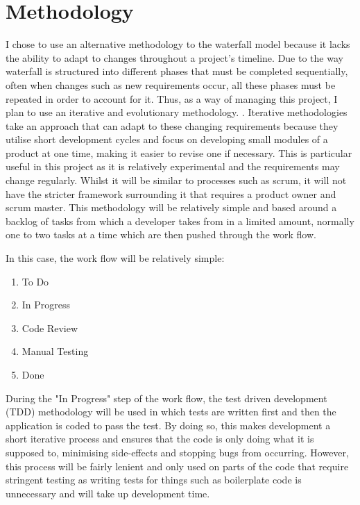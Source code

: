 \documentclass[]{report}
\begin{document}
	\chapter{Methodology}
	I chose to use an alternative methodology to the waterfall model because it lacks the ability to adapt to changes throughout a project's timeline. Due to the way waterfall is structured into different phases that must be completed sequentially, often when changes such as new requirements occur, all these phases must be repeated in order to account for it.	Thus, as a way of managing this project, I plan to use an iterative and evolutionary methodology. . Iterative methodologies take an approach that can adapt to these changing requirements because they utilise short development cycles and focus on developing small modules of a product at one time, making it easier to revise one if necessary. This is particular useful in this project as it is relatively experimental and the requirements may change regularly. Whilst it will be similar to processes such as scrum, it will not have the stricter framework surrounding it that requires a product owner and scrum master. This methodology will be relatively simple and based around a backlog of tasks from which a developer takes from in a limited amount, normally one to two tasks at a time which are then pushed through the work flow.
		
	In this case, the work flow will be relatively simple:
	\begin{enumerate}
		\item To Do
		\item In Progress
		\item Code Review
		\item Manual Testing
		\item Done
	\end{enumerate}
		
	During the "In Progress" step of the work flow, the test driven development (TDD) methodology will be used in which tests are written first and then the application is coded to pass the test. By doing so, this makes development a short iterative process and ensures that the code is only doing what it is supposed to, minimising side-effects and stopping bugs from occurring. However, this process will be fairly lenient and only used  on parts of the code that require stringent testing as writing tests for things such as boilerplate code is unnecessary and will take up development time. 
	
\end{document}
